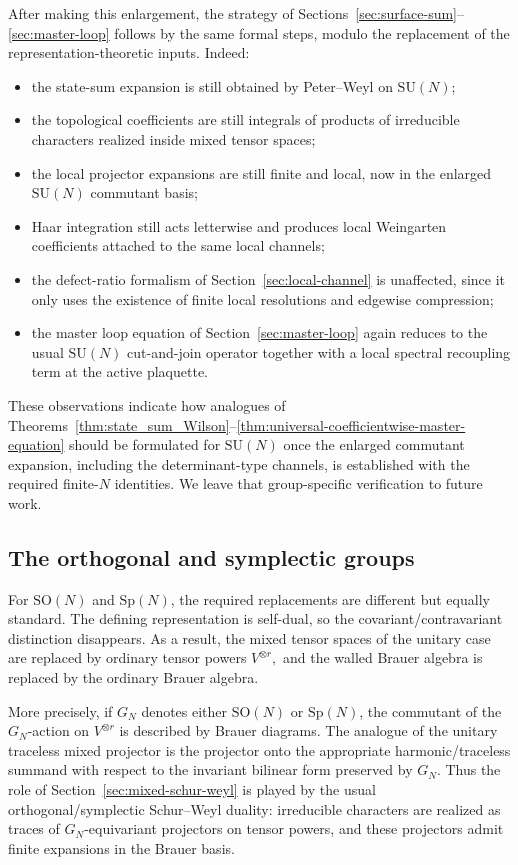 \documentclass[11pt,a4paper,reqno]{article}
\theoremstyle{definition}
\theoremstyle{remark}
\newcommand\SU{{\mathrm{SU}}}
\newcommand\SO{{\mathrm{SO}}}
\newcommand\Sp{{\mathrm{Sp}}}
\begin{document}
After making this enlargement, the strategy of Sections~\ref{sec:surface-sum}--\ref{sec:master-loop} follows by the same formal steps, modulo the replacement of the representation-theoretic inputs.
Indeed:
\begin{itemize}
\item the state-sum expansion is still obtained by Peter--Weyl on $\SU(N)$;
\item the topological coefficients are still integrals of products of irreducible characters realized inside mixed tensor spaces;
\item the local projector expansions are still finite and local, now in the enlarged $\SU(N)$ commutant basis;
\item Haar integration still acts letterwise and produces local Weingarten coefficients attached to the same local channels;
\item the defect-ratio formalism of Section~\ref{sec:local-channel} is unaffected, since it only uses the existence of finite local resolutions and edgewise compression;
\item the master loop equation of Section~\ref{sec:master-loop} again reduces to the usual $\SU(N)$ cut-and-join operator together with a local spectral recoupling term at the active plaquette.
\end{itemize}

These observations indicate how analogues of Theorems~\ref{thm:state_sum_Wilson}--\ref{thm:universal-coefficientwise-master-equation} should be formulated for $\SU(N)$ once the enlarged commutant expansion, including the determinant-type channels, is established with the required finite-$N$ identities. We leave that group-specific verification to future work.

\subsection{The orthogonal and symplectic groups}

For $\SO(N)$ and $\Sp(N)$, the required replacements are different but equally standard. The defining representation is self-dual, so the covariant/contravariant distinction disappears. As a result, the mixed tensor spaces of the unitary case are replaced by ordinary tensor powers $V^{\otimes r},$ and the walled Brauer algebra is replaced by the ordinary Brauer algebra.

More precisely, if $G_N$ denotes either $\SO(N)$ or $\Sp(N)$, the commutant of the $G_N$-action on $V^{\otimes r}$ is described by Brauer diagrams. The analogue of the unitary traceless mixed projector is the projector onto the appropriate harmonic/traceless summand with respect to the invariant bilinear form preserved by $G_N$. Thus the role of Section~\ref{sec:mixed-schur-weyl} is played by the usual orthogonal/symplectic Schur--Weyl duality: irreducible characters are realized as traces of $G_N$-equivariant projectors on tensor powers, and these projectors admit finite expansions in the Brauer basis.
\end{document}
